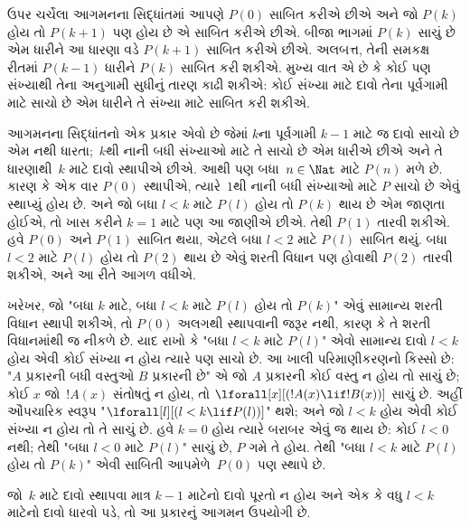 \documentclass[../../../include/open-logic-section]{subfiles}
\begin{document}


ઉપર ચર્ચેલા આગમનના સિદ્ધાંતમાં આપણે $P(0)$ સાબિત કરીએ છીએ
અને જો $P(k)$ હોય તો $P(k+1)$ પણ હોય છે એ સાબિત કરીએ છીએ.
બીજા ભાગમાં $P(k)$ સાચું છે એમ ધારીને આ ધારણા વડે
$P(k+1)$ સાબિત કરીએ છીએ. અલબત્ત, તેની સમકક્ષ રીતમાં
$P(k-1)$ ધારીને $P(k)$ સાબિત કરી શકીએ. મુખ્ય વાત એ છે કે
કોઈ પણ સંખ્યાથી તેના અનુગામી સુધીનું તારણ કાઢી શકીએ:
કોઈ સંખ્યા માટે દાવો તેના પૂર્વગામી માટે સાચો છે એમ
ધારીને તે સંખ્યા માટે સાબિત કરી શકીએ.

આગમનના સિદ્ધાંતનો એક પ્રકાર એવો છે જેમાં $k$ના પૂર્વગામી
$k-1$ માટે જ દાવો સાચો છે એમ નથી ધારતા;~$k$થી નાની
બધી સંખ્યાઓ માટે તે સાચો છે એમ ધારીએ છીએ અને તે
ધારણાથી~$k$ માટે દાવો સ્થાપીએ છીએ. આથી પણ બધા~$n \in
\Nat$ માટે $P(n)$ મળે છે. કારણ કે એક વાર $P(0)$
સ્થાપીએ, ત્યારે~$1$થી નાની બધી સંખ્યાઓ માટે $P$ સાચો
છે એવું સ્થાપ્યું હોય છે. અને જો બધા $l<k$ માટે $P(l)$
હોય તો $P(k)$ થાય છે એમ જાણતા હોઈએ, તો ખાસ કરીને
$k=1$ માટે પણ આ જાણીએ છીએ. તેથી $P(1)$ તારવી
શકીએ. હવે $P(0)$ અને $P(1)$ સાબિત થયા, એટલે બધા
$l<2$ માટે $P(l)$ સાબિત થયું. બધા $l<2$ માટે $P(l)$
હોય તો $P(2)$ થાય છે એવું શરતી વિધાન પણ હોવાથી
$P(2)$ તારવી શકીએ, અને આ રીતે આગળ વધીએ.

ખરેખર, જો "બધા $k$ માટે, બધા $l<k$ માટે $P(l)$
હોય તો $P(k)$" એવું સામાન્ય શરતી વિધાન સ્થાપી શકીએ,
તો $P(0)$ અલગથી સ્થાપવાની જરૂર નથી, કારણ કે તે
શરતી વિધાનમાંથી જ નીકળે છે. યાદ રાખો કે "બધા
$l<k$ માટે $P(l)$" એવો સામાન્ય દાવો $l<k$ હોય
એવી કોઈ સંખ્યા ન હોય ત્યારે પણ સાચો છે. આ
ખાલી પરિમાણીકરણનો કિસ્સો છે: "$A$ પ્રકારની
બધી વસ્તુઓ $B$ પ્રકારની છે" એ જો $A$ પ્રકારની
કોઈ વસ્તુ ન હોય તો સાચું છે; કોઈ $x$ જો~$!A(x)$
સંતોષતું ન હોય, તો $\lforall[x][(!A(x) \lif !B(x))]$
સાચું છે. અહીં ઔપચારિક સ્વરૂપ
"$\lforall[l][(l < k \lif P(l))]$" થશે; અને જો
$l < k$ હોય એવી કોઈ સંખ્યા ન હોય તો તે સાચું છે.
હવે $k=0$ હોય ત્યારે બરાબર એવું જ થાય છે:
કોઈ $l<0$ નથી; તેથી "બધા $l<0$ માટે $P(l)$"
સાચું છે, $P$ ગમે તે હોય. તેથી "બધા
$l<k$ માટે $P(l)$ હોય તો $P(k)$" એવી સાબિતી
આપમેળે~$P(0)$ પણ સ્થાપે છે.

જો~$k$ માટે દાવો સ્થાપવા માત્ર $k-1$ માટેનો દાવો
પૂરતો ન હોય અને એક કે વધુ $l<k$ માટેનો દાવો
ધારવો પડે, તો આ પ્રકારનું આગમન ઉપયોગી છે.
\end{document}
